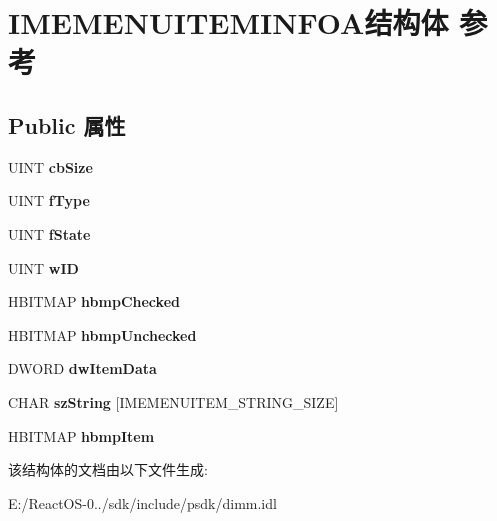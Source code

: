 \hypertarget{struct_i_m_e_m_e_n_u_i_t_e_m_i_n_f_o_a}{}\section{I\+M\+E\+M\+E\+N\+U\+I\+T\+E\+M\+I\+N\+F\+O\+A结构体 参考}
\label{struct_i_m_e_m_e_n_u_i_t_e_m_i_n_f_o_a}
\subsection*{Public 属性}
\begin{DoxyCompactItemize}
\item 
\mbox{\label{struct_i_m_e_m_e_n_u_i_t_e_m_i_n_f_o_a_a05ffbcf1e7bd7894e3353de85215877a}} 
U\+I\+NT {\bfseries cb\+Size}
\item 
\mbox{\label{struct_i_m_e_m_e_n_u_i_t_e_m_i_n_f_o_a_a394bf114406f323eb5330a446a84db2b}} 
U\+I\+NT {\bfseries f\+Type}
\item 
\mbox{\label{struct_i_m_e_m_e_n_u_i_t_e_m_i_n_f_o_a_a3e9335ded2a5484ad815e8b56ffcd7d0}} 
U\+I\+NT {\bfseries f\+State}
\item 
\mbox{\label{struct_i_m_e_m_e_n_u_i_t_e_m_i_n_f_o_a_abe65ed25f1427fd306df847b8452a4c3}} 
U\+I\+NT {\bfseries w\+ID}
\item 
\mbox{\label{struct_i_m_e_m_e_n_u_i_t_e_m_i_n_f_o_a_ad0a275f5f25dcaa5ca833bbbf94915d2}} 
H\+B\+I\+T\+M\+AP {\bfseries hbmp\+Checked}
\item 
\mbox{\label{struct_i_m_e_m_e_n_u_i_t_e_m_i_n_f_o_a_adb699f41ca45054d4fce76b782bf078b}} 
H\+B\+I\+T\+M\+AP {\bfseries hbmp\+Unchecked}
\item 
\mbox{\label{struct_i_m_e_m_e_n_u_i_t_e_m_i_n_f_o_a_a10ec78fa71ab4638076239dd97bebfe2}} 
D\+W\+O\+RD {\bfseries dw\+Item\+Data}
\item 
\mbox{\label{struct_i_m_e_m_e_n_u_i_t_e_m_i_n_f_o_a_a5d2759a1b2164db25145baf4458a4d20}} 
C\+H\+AR {\bfseries sz\+String} \mbox{[}I\+M\+E\+M\+E\+N\+U\+I\+T\+E\+M\+\_\+\+S\+T\+R\+I\+N\+G\+\_\+\+S\+I\+ZE\mbox{]}
\item 
\mbox{\label{struct_i_m_e_m_e_n_u_i_t_e_m_i_n_f_o_a_a245b2b6f77a603a26a054ef9fca94b08}} 
H\+B\+I\+T\+M\+AP {\bfseries hbmp\+Item}
\end{DoxyCompactItemize}


该结构体的文档由以下文件生成\+:\begin{DoxyCompactItemize}
\item 
E\+:/\+React\+O\+S-\/0../sdk/include/psdk/dimm.\+idl\end{DoxyCompactItemize}
